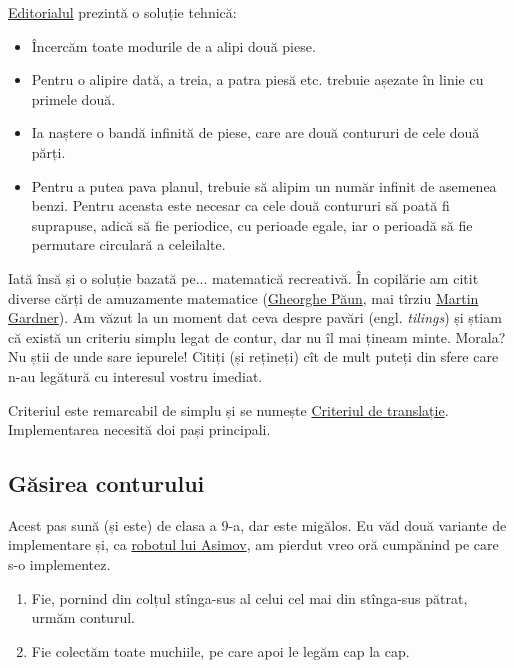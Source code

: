 \href{https://drive.google.com/drive/folders/1-A5BjiaxuC3dEPpeFdaC-oqiVXvnj1TN}{Editorialul} prezintă o soluție tehnică:

\begin{itemize}
  \item Încercăm toate modurile de a alipi două piese.

  \item Pentru o alipire dată, a treia, a patra piesă etc. trebuie așezate în linie cu primele două.

  \item Ia naștere o bandă infinită de piese, care are două contururi de cele două părți.

  \item Pentru a putea pava planul, trebuie să alipim un număr infinit de asemenea benzi. Pentru aceasta este necesar ca cele două contururi să poată fi suprapuse, adică să fie periodice, cu perioade egale, iar o perioadă să fie permutare circulară a celeilalte.
\end{itemize}

Iată însă și o soluție bazată pe... matematică recreativă. În copilărie am citit diverse cărți de amuzamente matematice (\href{https://ro.wikipedia.org/wiki/Gheorghe_P\%C4\%83un\#C\%C4\%83r\%C8\%9Bi_de_cultur\%C4\%83_\%C8\%99tiin\%C8\%9Bific\%C4\%83}{Gheorghe Păun}, mai tîrziu \href{https://en.wikipedia.org/wiki/Martin_Gardner_bibliography}{Martin Gardner}). Am văzut la un moment dat ceva despre pavări (engl. \textit{tilings}) și știam că există un criteriu simplu legat de contur, dar nu îl mai țineam minte. Morala? Nu știi de unde sare iepurele! Citiți (și rețineți) cît de mult puteți din sfere care n-au legătură cu interesul vostru imediat.

Criteriul este remarcabil de simplu și se numește \href{https://minos.tessera.li/tiling}{Criteriul de translație}. Implementarea necesită doi pași principali.

\subsection{Găsirea conturului}

Acest pas sună (și este) de clasa a 9-a, dar este migălos. Eu văd două variante de implementare și, ca \href{https://en.wikipedia.org/wiki/Runaround_(story)}{robotul lui Asimov}, am pierdut vreo oră cumpănind pe care s-o implementez.

\begin{enumerate}
  \item Fie, pornind din colțul stînga-sus al celui cel mai din stînga-sus pătrat, urmăm conturul.
  \item Fie colectăm toate muchiile, pe care apoi le legăm cap la cap.
\end{enumerate}

